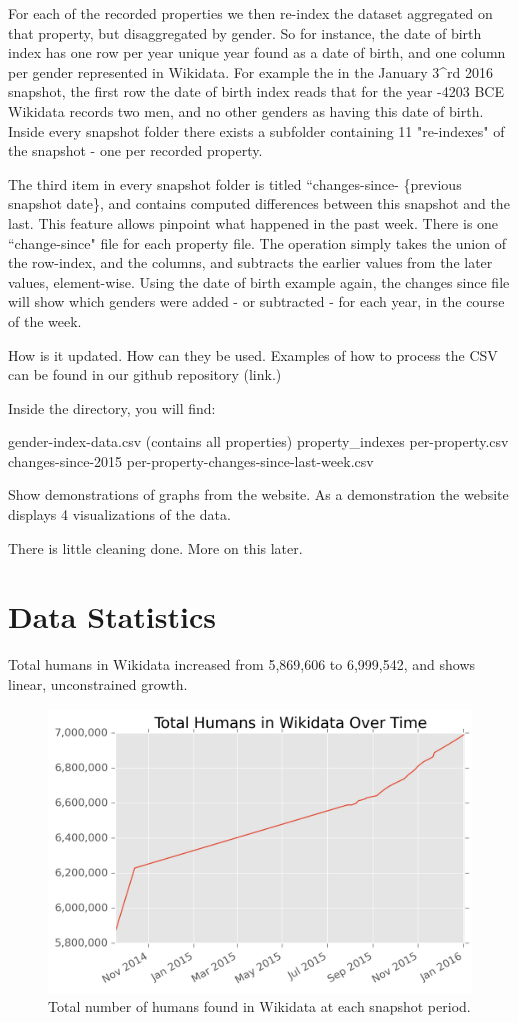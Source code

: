 \documentclass[letterpaper]{article}
\begin{document}
For each of the recorded properties we then re-index the dataset aggregated on that property, but disaggregated by gender. So for instance, the date of birth index has one row per year unique year found as a date of birth, and one column per gender represented in Wikidata. For example the in the January 3^{rd} 2016 snapshot, the first row the date of birth index reads that for the year -4203 BCE Wikidata records two men, and no other genders as having this date of birth. Inside every snapshot folder there exists a subfolder containing 11 "re-indexes" of the snapshot - one per recorded property.
 
 The third item in every snapshot folder is titled ``changes-since- \{previous snapshot date\}, and contains computed differences between this snapshot and the last. This feature allows pinpoint what happened in the past week. There is one ``change-since" file for each property file. The operation simply takes the union of the row-index, and the columns, and subtracts the earlier values from the later values, element-wise. Using the date of birth example again, the changes since file will show which genders were added - or subtracted - for each year, in the course of the week.
   
How is it updated.
How can they be used. Examples of how to process the CSV can be found in our github repository (link.)

Inside the directory, you will find:

gender-index-data.csv (contains all properties)
property_indexes
per-property.csv
changes-since-2015
per-property-changes-since-last-week.csv

Show demonstrations of graphs from the website. As a demonstration the website displays 4 visualizations of the data. 


There is little cleaning done. More on this later.

\section{Data Statistics}
Total humans in Wikidata increased from 5,869,606 to 6,999,542, and shows linear, unconstrained growth.
\begin{figure}
\label{fig:totalhumans}
\includegraphics[scale=0.6]{figures/totalhumans.png} 
\caption{Total number of humans found in Wikidata at each snapshot period.}
\end{figure}
\end{document}
